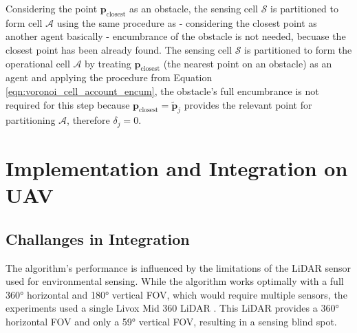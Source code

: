             Considering the point $\mathbf{p}_{\text{closest}}$ as an obstacle, the sensing cell $\mathcal{S}$ is partitioned to form cell $\mathcal{A}$ using the same procedure as  - considering the closest point as another agent basically - encumbrance of the obstacle is not needed, becuase the closest point has been already found.
            The sensing cell $\mathcal{S}$ is partitioned to form the operational cell $\mathcal{A}$ by treating $\mathbf{p}_{\text{closest}}$ (the nearest point on an obstacle) as an agent and applying the procedure from Equation \eqref{eqn:voronoi_cell_account_encum}, the obstacle's full encumbrance is not required for this step because $\mathbf{p}_{\text{closest}} = \tilde{\mathbf{p}}_{j}$ provides the relevant point for partitioning $\mathcal{A}$, therefore $\delta_j = 0$.

            

    \section{Implementation and Integration on UAV}
    \label{sec:implementation_integration}
        \subsection{Challanges in Integration}
            The algorithm's performance is influenced by the limitations of the \ac{LiDAR} sensor used for environmental sensing. 
            While the algorithm works optimally with a full 360° horizontal and 180° vertical \ac{FOV}, which would require multiple sensors, the experiments used a single Livox Mid 360 \ac{LiDAR} \cite{livox_mid360}. 
            This \ac{LiDAR} provides a 360° horizontal \ac{FOV} and only a 59° vertical \ac{FOV}, resulting in a sensing blind spot.

